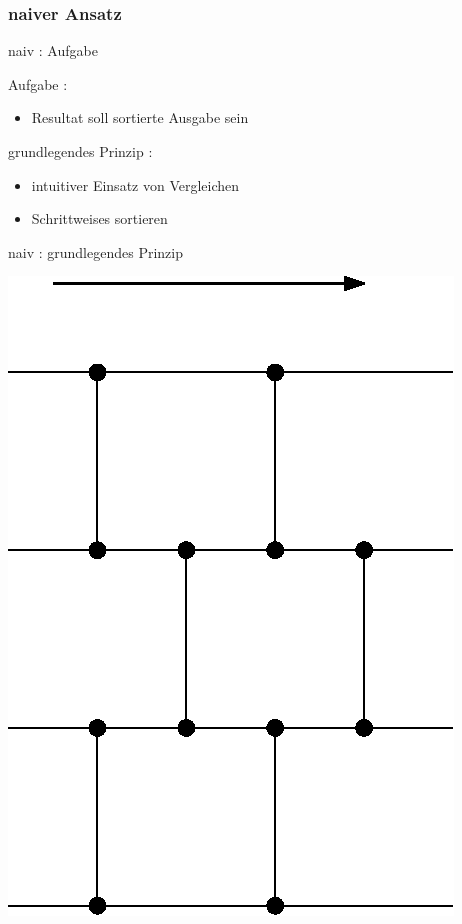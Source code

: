 \documentclass[ucs,9pt]{beamer}
\begin{document}
\subsubsection*{naiver Ansatz}

\begin{frame}{naiv : Aufgabe}
 {Aufgabe :\\
        \begin{itemize}
            \item Resultat soll sortierte Ausgabe sein
            \end{itemize}
            }
 {grundlegendes Prinzip :
        \begin{itemize}
            \item intuitiver Einsatz von Vergleichen
            \item Schrittweises sortieren
        \end{itemize}}
\end{frame}

\begin{frame}{naiv : grundlegendes Prinzip}
\begin{center}
    \includegraphics[scale=0.8]{bild2Komparatornetzwerk.eps}
\end{center}
\end{frame}
\end{document}

